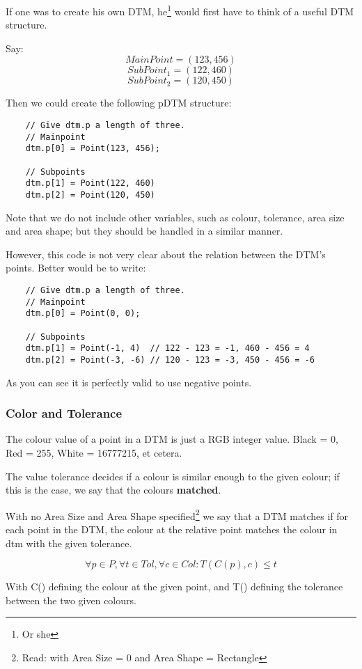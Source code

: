 \documentclass[a4paper, 10pt]{report} %
\begin{document}
If one was to create his own DTM, he\footnote{Or she} would first have to
think of a useful DTM structure.

Say:
$$ MainPoint = (123, 456)  $$
$$ SubPoint_1 = (122, 460) $$
$$ SubPoint_2 = (120, 450) $$

Then we could create the following pDTM structure:

\begin{lstlisting}
	// Give dtm.p a length of three.
	// Mainpoint
	dtm.p[0] = Point(123, 456);

	// Subpoints
	dtm.p[1] = Point(122, 460)
	dtm.p[2] = Point(120, 450)
\end{lstlisting}

Note that we do not include other variables, such as colour, tolerance, area
size and area shape; but they should be handled in a similar manner.

However, this code is not very clear about the relation between the DTM's
 points. Better would be to write:

\begin{lstlisting}
    // Give dtm.p a length of three.
    // Mainpoint
    dtm.p[0] = Point(0, 0);

    // Subpoints
    dtm.p[1] = Point(-1, 4)  // 122 - 123 = -1, 460 - 456 = 4
    dtm.p[2] = Point(-3, -6) // 120 - 123 = -3, 450 - 456 = -6
\end{lstlisting}

As you can see it is perfectly valid to use negative points.

\subsubsection{Color and Tolerance}

The colour value of a point in a DTM is just a RGB integer value.
Black = 0, Red = 255, White = 16777215, et cetera.

The value tolerance decides if a colour is similar enough to the given
colour; if this is the case, we say that the colours \textbf{matched}.

With no Area Size and Area Shape specified\footnote{Read: with Area
Size = 0 and Area Shape = Rectangle} we say that a DTM matches if for each
point in the DTM, the colour at the relative point matches the colour in dtm
with the given tolerance.

$$ \forall p \in P, \forall t \in Tol, \forall c \in Col : T(C(p), c) \leq t
 $$

With C() defining the colour at the given point, and T() defining the tolerance
between the two given colours.
\end{document}
